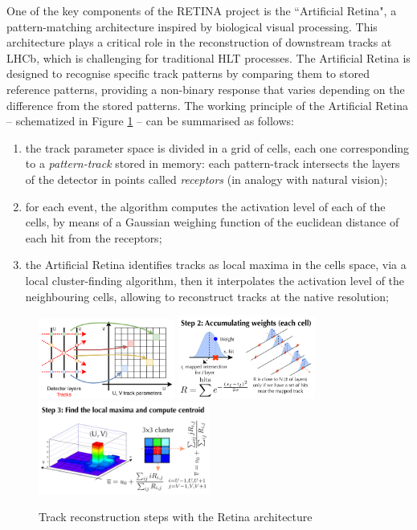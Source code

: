 One of the key components of the RETINA project is the ``Artificial Retina"\cite{Ristori:2000vg}, a pattern-matching architecture inspired by biological visual processing. This architecture plays a critical role in the reconstruction of downstream tracks at LHCb, which is challenging 
for traditional HLT processes. The Artificial Retina is designed to recognise specific track patterns by comparing them to stored reference patterns, providing a non-binary response that varies depending on the difference from the stored patterns. The working principle of the Artificial Retina -- schematized in Figure \ref{fig:retina_algo} -- can be summarised as follows\cite{Ristori:2000vg,Lazzari:2801062, Morello:2888549}:
\begin{enumerate}
\item  the track parameter space is divided in a grid of cells, each one corresponding to a \textit{pattern-track} stored in memory: each pattern-track intersects the layers of the detector in points called \textit{receptors} (in analogy with natural vision);
\item  for each event, the algorithm computes the activation level of each of the cells, by means of a Gaussian weighing function of the euclidean distance of each hit from the receptors;
\item the Artificial Retina identifies tracks as local maxima in the cells space, via a local cluster-finding algorithm, then it interpolates the activation level of the neighbouring cells, allowing to reconstruct tracks at the native resolution;
\end{enumerate}
\begin{figure}
    \centering
    \includegraphics[width=0.4\textwidth]{figures/retina-mapping.png}\hfill
    \includegraphics[width=0.4\textwidth]{figures/retina_algo_step2.png}
    \includegraphics[width=0.5\textwidth]{figures/retina_algo_step3.png}
    \caption{Track reconstruction steps with the Retina architecture}
    \label{fig:retina_algo}
\end{figure}
